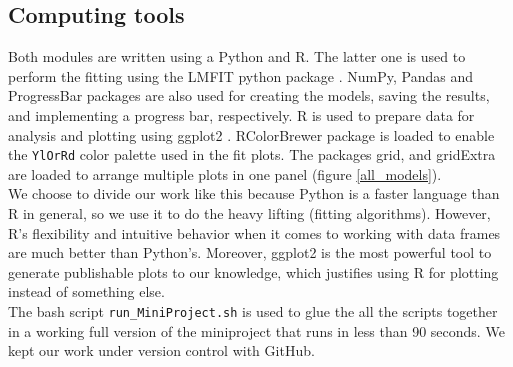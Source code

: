 \documentclass[titlepage,11pt]{article}
\begin{document}
\begin{linenumbers}
		\subsection{Computing tools}
		Both modules are written using a Python and R. The latter one is used to perform the fitting using the LMFIT python package \cite{Newville2014}. NumPy, Pandas \cite{Virtanen2020} and ProgressBar packages are also used for creating the models, saving the results, and implementing a progress bar, respectively. R is used to prepare data for analysis and plotting using ggplot2 \cite{Wickham2016}. RColorBrewer package is loaded to enable the \verb|YlOrRd| color palette used in the fit plots. The packages grid, and gridExtra are loaded to arrange multiple plots in one panel (figure \ref{all_models}).\\
		We choose to divide our work like this because Python is a faster language than R in general, so we use it to do the heavy lifting (fitting algorithms). However, R's flexibility and intuitive behavior when it comes to working with data frames are much better than Python's. Moreover, ggplot2 is the most powerful tool to generate publishable plots to our knowledge, which justifies using R for plotting instead of something else.\\
		The bash script \verb|run_MiniProject.sh| is used to glue the all the scripts together in a working full version of the miniproject that runs in less than 90 seconds. We kept our work under version control with GitHub.
		

\end{linenumbers}
\end{document}
